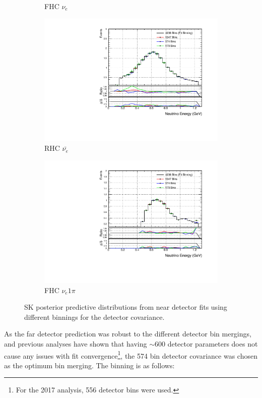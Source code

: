 \begin{figure}
\begin{subfigure}{.49\textwidth}
  \caption{FHC $\nu_{e}$}
\end{subfigure}
\begin{subfigure}{.49\textwidth}
  \centering
  \includegraphics[width=0.95\linewidth]{figs/detbin_nuebar}
  \caption{RHC $\bar{\nu_{e}}$}
\end{subfigure}
\begin{subfigure}{.49\textwidth}
  \centering
  \includegraphics[width=0.95\linewidth]{figs/detbin_nue1pi}
  \caption{FHC $\nu_{e} 1\pi$}
\end{subfigure}
\caption{SK posterior predictive distributions from near detector fits using different binnings for the detector covariance.}
\label{fig:detbinSK}
\end{figure}

As the far detector prediction was robust to the different detector bin mergings, and previous analyses have shown that having $\sim600$ detector parameters does not cause any issues with fit convergence\footnote{For the 2017 analysis, 556 detector bins were used.}, the 574 bin detector covariance was chosen as the optimum bin merging. The binning is as follows:

